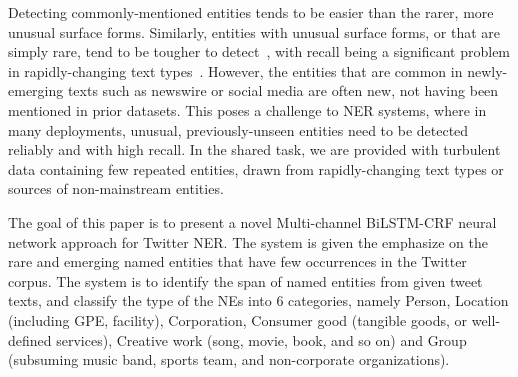 Detecting commonly-mentioned entities tends to be easier than the rarer, more unusual surface forms. Similarly, entities with unusual surface forms, or that are simply rare, tend to be tougher to detect~\cite{augenstein2017generalisation}, with recall being a significant problem in rapidly-changing text types~\cite{derczynski2015analysis}. However, the entities that are common in newly-emerging texts such as newswire or social media are often new, not having been mentioned in prior datasets. This poses a challenge to NER systems, where in many deployments, unusual, previously-unseen entities need to be detected reliably and with high recall. In the shared task, we are provided with turbulent data containing few repeated entities, drawn from rapidly-changing text types or sources of non-mainstream entities.

The goal of this paper is to present a novel Multi-channel BiLSTM-CRF neural network approach for Twitter NER. The system is given the emphasize on the rare and emerging named entities that have few occurrences in the Twitter corpus. The system is to identify the span of named entities from given tweet texts, and classify the type of the NEs into 6 categories, namely Person, Location (including GPE, facility), Corporation, Consumer good (tangible goods, or well-defined services), Creative work (song, movie, book, and so on) and Group (subsuming music band, sports team, and non-corporate organizations).


